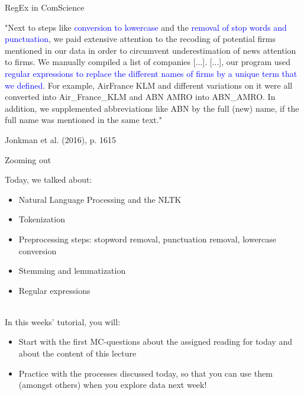 \documentclass[handout]{beamer}
\begin{document}
\begin{frame}[fragile]{RegEx in ComScience}

\begin{small}
"Next to steps like \textcolor{blue}{conversion to lowercase} and the  \textcolor{blue}{removal of stop words and punctuation}, we paid extensive attention to the recoding of potential firms mentioned in our data in order to circumvent underestimation of news attention to firms. We manually compiled a list of companies [...]. [...], our program used \textcolor{blue}{regular expressions to replace the different names of firms by a unique term that we defined}. For example, AirFrance KLM and different variations on it were all converted into Air\_France\_KLM and ABN AMRO into ABN\_AMRO. In addition, we supplemented abbreviations like ABN by the full (new) name, if the full name was mentioned in the same text."
\end{small}
\begin{tiny}
Jonkman et al. (2016), p. 1615 
\end{tiny}

\end{frame}


\begin{frame}{Zooming out} 
	
Today, we talked about:
\begin{itemize}
	\item Natural Language Processing and the NLTK
	\item Tokenization
	\item Preprocessing steps: stopword removal, punctuation removal, lowercase conversion
	\item Stemming and lemmatization
	\item Regular expressions \\\
\end{itemize}

\end{frame}

\begin{frame}
	
In this weeks' tutorial, you will:
\begin{itemize}
	\item Start with the first MC-questions about the assigned reading for today and about the content of this lecture
	\item Practice with the processes discussed today, so that you can use them (amongst others) when you explore data next week!
\end{itemize}
	
\end{frame}
\end{document}
